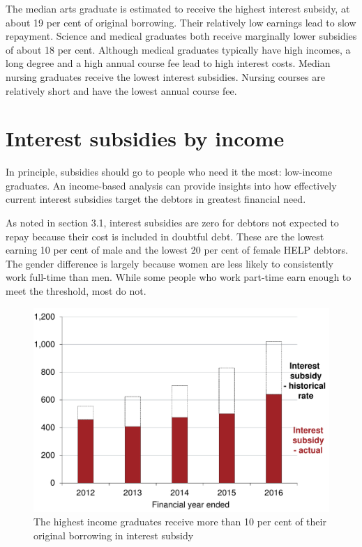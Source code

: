 \documentclass[embargoed]{grattan}
\begin{document}
The median arts graduate is estimated to receive the highest interest subsidy, at about 19 per cent of original borrowing.
Their relatively low earnings lead to slow repayment.
Science and medical graduates both receive marginally lower subsidies of about 18 per cent.
Although medical graduates typically have high incomes, a long degree and a high annual course fee lead to high interest costs.
Median nursing graduates receive the lowest interest subsidies.
Nursing courses are relatively short and have the lowest annual course fee.

\section{Interest subsidies by income}\label{interest-subsidies-by-income}

In principle, subsidies should go to people who need it the most: low-income graduates.
An income-based analysis can provide insights into how effectively current interest subsidies target the debtors in greatest financial need.

As noted in section 3.1, interest subsidies are zero for debtors not expected to repay because their cost is included in doubtful debt.
These are the lowest earning 10 per cent of male and the lowest 20 per cent of female \gls{HELP} debtors.
The gender difference is largely because women are less likely to consistently work full-time than men.
While some people who work part-time earn enough to meet the threshold, most do not.

\begin{figure}
\caption{The highest income graduates receive more than 10 per cent of their original borrowing in interest subsidy}\label{fig:fig10-highest-income-grads-receive-over-10pc-original-borrowing-interest-subsidy}

\includegraphics[page=10]{atlas/Chartpack.pdf}

\end{figure}
\end{document}
